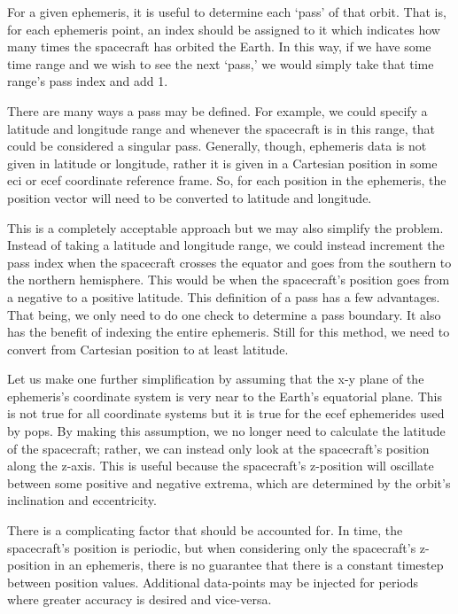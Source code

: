 For a given ephemeris, it is useful to determine each `pass' of that orbit.
That is, for each ephemeris point, an index should be assigned to it which
indicates how many times the spacecraft has orbited the Earth. In this way, if
we have some time range and we wish to see the next `pass,' we would simply
take that time range's pass index and add 1.

There are many ways a pass may be defined. For example, we could specify a
latitude and longitude range and whenever the spacecraft is in this range, that
could be considered a singular pass.  Generally, though, ephemeris data is not
given in latitude or longitude, rather it is given in a Cartesian position in
some \gls{eci} or \gls{ecef} coordinate reference frame. So, for each position
in the ephemeris, the position vector will need to be converted to latitude and
longitude. 

This is a completely acceptable approach but we may also simplify the problem.
Instead of taking a latitude and longitude range, we could instead increment
the pass index when the spacecraft crosses the equator and goes from the
southern to the northern hemisphere. This would be when the spacecraft's
position goes from a negative to a positive latitude. This definition of a pass
has a few advantages. That being, we only need to do one check to determine a
pass boundary. It also has the benefit of indexing the entire ephemeris. Still
for this method, we need to convert from Cartesian position to at least
latitude.

Let us make one further simplification by assuming that the x-y plane of the
ephemeris's coordinate system is very near to the Earth's equatorial plane.
This is not true for all coordinate systems but it is true for the \gls{ecef}
ephemerides used by \gls{pops}. By making this assumption, we no longer need to
calculate the latitude of the spacecraft; rather, we can instead only look at
the spacecraft's position along the z-axis. This is useful because the
spacecraft's z-position will oscillate between some positive and negative
extrema, which are determined by the orbit's inclination and eccentricity. 

There is a complicating factor that should be accounted for. In time, the
spacecraft's position is periodic, but when considering only the spacecraft's
z-position in an ephemeris, there is no guarantee that there is a constant
timestep between position values. Additional data-points may be injected for
periods where greater accuracy is desired and vice-versa. 

